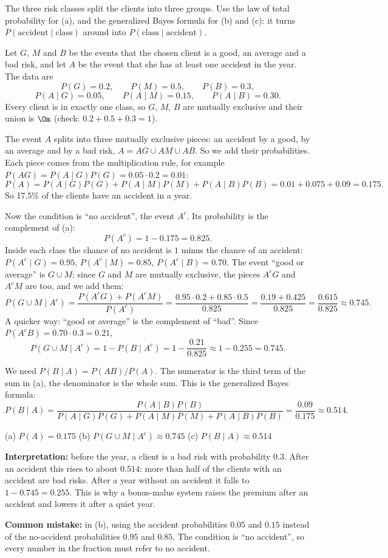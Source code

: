 \begin{solution}
	\idea The three risk classes split the clients into three groups. Use the
	law of total probability for (a), and the generalized Bayes formula for (b)
	and (c): it turns $P(\text{accident}\mid\text{class})$ around into
	$P(\text{class}\mid\text{accident})$.

	Let $G$, $M$ and $B$ be the events that the chosen client is a good, an
	average and a bad risk, and let $A$ be the event that she has at least one
	accident in the year. The data are
	\[ P(G)=0.2,\qquad P(M)=0.5,\qquad P(B)=0.3, \]
	\[ P(A\mid G)=0.05,\qquad P(A\mid M)=0.15,\qquad P(A\mid B)=0.30. \]
	Every client is in exactly one class, so $G$, $M$, $B$ are mutually
	exclusive and their union is $\Om$ (check: $0.2+0.5+0.3=1$).

	 The event $A$ splits into three mutually exclusive pieces: an
	accident by a good, by an average and by a bad risk, $A=AG\cup AM\cup AB$.
	So we add their probabilities. Each piece comes from the multiplication
	rule, for example $P(AG)=P(A\mid G)P(G)=0.05\cdot0.2=0.01$:
	\[ P(A)=P(A\mid G)P(G)+P(A\mid M)P(M)+P(A\mid B)P(B)
		=0.01+0.075+0.09=0.175. \]
	So 17.5\% of the clients have an accident in a year.

	 Now the condition is ``no accident'', the event $A^c$. Its
	probability is the complement of (a):
	\[ P(A^c)=1-0.175=0.825. \]
	Inside each class the chance of no accident is $1$ minus the chance of an
	accident: $P(A^c\mid G)=0.95$, $P(A^c\mid M)=0.85$, $P(A^c\mid B)=0.70$.
	The event ``good or average'' is $G\cup M$; since $G$ and $M$ are mutually
	exclusive, the pieces $A^cG$ and $A^cM$ are too, and we add them:
	\[ P(G\cup M\mid A^c)=\frac{P(A^cG)+P(A^cM)}{P(A^c)}
		=\frac{0.95\cdot0.2+0.85\cdot0.5}{0.825}
		=\frac{0.19+0.425}{0.825}=\frac{0.615}{0.825}\approx0.745. \]
	A quicker way: ``good or average'' is the complement of ``bad''. Since
	$P(A^cB)=0.70\cdot0.3=0.21$,
	\[ P(G\cup M\mid A^c)=1-P(B\mid A^c)=1-\frac{0.21}{0.825}
		\approx1-0.255=0.745. \]

	 We need $P(B\mid A)=P(AB)/P(A)$. The numerator is the third term
	of the sum in (a), the denominator is the whole sum. This is the
	generalized Bayes formula:
	\[ P(B\mid A)=\frac{P(A\mid B)P(B)}
		{P(A\mid G)P(G)+P(A\mid M)P(M)+P(A\mid B)P(B)}
		=\frac{0.09}{0.175}\approx0.514. \]
	\begin{answer}
		(a) $P(A)=0.175$ \quad (b) $P(G\cup M\mid A^c)\approx0.745$ \quad
		(c) $P(B\mid A)\approx0.514$
	\end{answer}
	\begin{remark}
		\textbf{Interpretation:} before the year, a client is a bad risk with
		probability $0.3$. After an accident this rises to about $0.514$: more
		than half of the clients with an accident are bad risks. After a year
		without an accident it falls to $1-0.745=0.255$. This is why a
		bonus-malus system raises the premium after an accident and lowers it
		after a quiet year.

		\textbf{Common mistake:} in (b), using the accident probabilities
		$0.05$ and $0.15$ instead of the no-accident probabilities $0.95$ and
		$0.85$. The condition is ``no accident'', so every number in the
		fraction must refer to no accident.
	\end{remark}
\end{solution}

